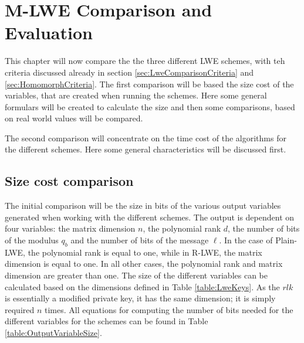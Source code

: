 \chapter{M-LWE Comparison and Evaluation}

This chapter will now compare the the three different LWE schemes, with teh criteria discussed already in section \ref{sec:LweComparisonCriteria} and \ref{sec:HomomorphCriteria}. The first comparison will be based the size cost of the variables, that are created when running the schemes. Here some general formulars will be created to calculate the size and then some comparisons, based on real world values will be compared.

The second comparison will concentrate on the time cost of the algorithms for the different schemes. Here some general characteristics will be discussed first. 

\section{Size cost comparison}

The initial comparison will be the size in bits of the various output variables generated when working with the different schemes. The output is dependent on four variables: the matrix dimension $n$, the polynomial rank $d$, the number of bits of the modulus $q_b$ and the number of bits of the message $\ell$. In the case of Plain-LWE, the polynomial rank is equal to one, while in R-LWE, the matrix dimension is equal to one. In all other cases, the polynomial rank and matrix dimension are greater than one. The size of the different variables can be calculated based on the dimensions defined in Table \ref{table:LweKeys}. As the $rlk$ is essentially a modified private key, it has the same dimension; it is simply required $n$ times. All equations for computing the number of bits needed for the different variables for the schemes can be found in Table \ref{table:OutputVariableSize}. 

